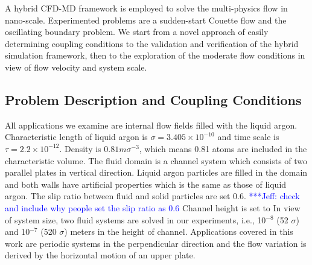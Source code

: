 \documentclass[preprint,12pt]{elsarticle}
\newcommand{\skonote}[1]{ {\textcolor{blue} { ***Jeff: #1 }}}
\newcommand{\skonote}[1]{}
\begin{document}
A hybrid CFD-MD framework is employed to solve the multi-physics flow in nano-scale. Experimented problems are a sudden-start Couette flow and the oscillating boundary problem. We start from a novel approach of easily determining coupling conditions to the validation and verification of the hybrid simulation framework, then to the exploration of the moderate flow conditions in view of flow velocity and system scale.

\subsection{Problem Description and Coupling Conditions}
All applications we examine are internal flow fields filled with the liquid argon. Characteristic length of liquid argon is ${\sigma}=3.405{\times}10^{-10}$ and time scale is $\tau=2.2{\times}10^{-12}$. Density is $0.81m{\sigma}^{-3}$, which means 0.81 atoms are included in the characteristic volume.
The fluid domain is a channel system which consists of two parallel plates in vertical direction. Liquid argon particles are filled in the domain and both walls have artificial properties which is the same as those of liquid argon. The slip ratio between fluid and solid particles are set 0.6.\skonote{check and include why people set the slip ratio as 0.6} Channel height is set to In view of system size, two fluid systems are solved in our experiments, i.e., 10$^{-8}$ (52 $\sigma$) and 10$^{-7}$ (520 $\sigma$) meters in the height of channel. Applications covered in this work are periodic systems in the perpendicular direction and the flow variation is derived by the horizontal motion of an upper plate.
\end{document}
